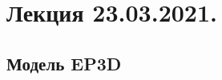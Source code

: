 \documentclass[main.tex]{subfiles}
\begin{document}

\section{Лекция 23.03.2021.}

\subsection{Модель EP3D}
\end{document}
